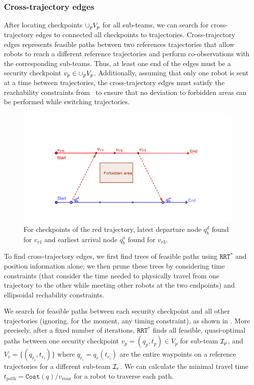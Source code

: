 \documentclass[journal]{IEEEtran}  %
\newcommand{\rrtstar}{$\texttt{RRT}^\texttt{*}$}
\begin{document}
\subsubsection{Cross-trajectory edges}\label{sec:cross-traj-edges}
After locating checkpoints $\cup_p V_p$ for all sub-teams, we can search for cross-trajectory edges to connected all checkpoints to trajectories. Cross-trajectory edges represents feasible paths between two references trajectories that allow robots to reach a different reference trajectories and perform co-observations with the corresponding sub-teams. 
Thus, at least one end of the edges must be a security checkpoint $v_{p} \in \cup_p V_p$. Additionally, assuming that only one robot is sent at a time between trajectories, the cross-trajectory edges must satisfy the reachability constraints from~ to ensure that no deviation to forbidden areas can be performed while switching trajectories.  

\begin{figure}[htbp]
\begin{center}
\includegraphics[width=0.6\linewidth]{two_edges}
\caption{For checkpoints of the red trajectory, latest departure node $q^{d}_{b}$ found for $v_{r1}$ and earliest arrival node $q^{a}_{b}$ found for $v_{r3}$.}
\label{fig:two-edges}
\end{center}
\end{figure}

To find cross-trajectory edges, we first find trees of feasible paths using \rrtstar{} and position information alone; we then prune these trees by considering time constraints (that consider the time needed to physically travel from one trajectory to the other while meeting other robots at the two endpoints) and ellipsoidal rechability constraints.

We search for feasible paths between each security checkpoint and all other trajectories (ignoring, for the moment, any timing constraint), as shown in  . 
More precisely, after a fixed number of  iterations, \rrtstar{}  finds all feasible, quasi-optimal paths between one security checkpoint $v_{p}=(q_{p},t_{p}) \in V_{p}$ for sub-team $\mathcal{I}_p$, and $V_{r} = \{ (q_{{r}_{i}}, t_{{r}_{i}}) \}$ where  $q_{{r}_{i}} = q_{r}(t_{{r}_{i}})$ are the entire waypoints on a reference trajectories for a different sub-team $\mathcal{I}_{r}$.
We can calculate the minimal travel time $t_{\textrm{path}}=\texttt{Cost}(q)/v_{max}$ for a robot to traverse each path. 
\end{document}
